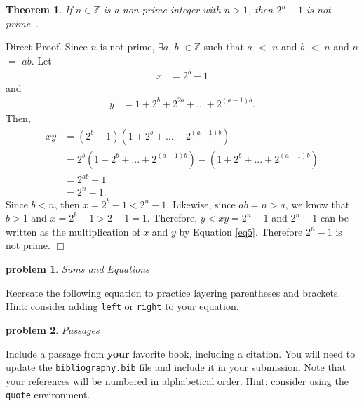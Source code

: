 \documentclass[10pt]{article}
\newenvironment{proof}{\par\noindent{\it Proof.}\hspace*{1em}}{$\Box$\bigskip}
\newtheorem{problem}{\sc\color{cit}problem}
\newtheorem{theorem}{Theorem}
\newcommand{\Z}{\mathbb{Z}} %
\begin{document}
\begin{theorem}
    If $n \in \Z$ is a non-prime integer with $n>1$, then $2^n - 1$ is not prime~\cite{velleman}.
\end{theorem}

\begin{proof}
    Direct Proof. Since $n$ is not prime, $\exists$$a$, $b$ $\in \Z$ such that $a$ $<$ $n$ and $b$ $<$ $n$ and $n$ $=$ $ab$. Let
    \begin{align*}
        x &= 2^b - 1
    \end{align*}
    and
    \begin{align*}
        y &= 1 + 2^b + 2^{2b} + ... + 2^{(a - 1)b}.
    \end{align*}
    Then, 
    \begin{align}
        xy &= (2^b - 1)(1 + 2^b + ... + 2^{(a - 1)b}) \\
           &= 2^b(1 + 2^b + ... + 2^{(a - 1)b}) - (1 + 2^b + ... + 2^{(a - 1)b}) \\
           &= 2^{ab} - 1 \\
           \label{eq5}
           &= 2^n - 1.
    \end{align}
    Since $b < n$, then $x = 2^b - 1 < 2^n - 1$. Likewise, since $ab = n > a$, we know that $b > 1$ and 
    $x = 2^b - 1 > 2 - 1 = 1$. Therefore, $y < xy = 2^n - 1$ and $2^n - 1$ can be written as the multiplication
    of $x$ and $y$ by Equation \ref{eq5}. Therefore $2^n - 1$ is not prime.
\end{proof}







\begin{problem} Sums and Equations \end{problem}

Recreate the following equation to practice layering parentheses and brackets.  Hint: consider adding \verb|left| or \verb|right| to your equation.






\begin{problem} Passages \end{problem}
    Include a passage from \textbf{your} favorite book, including a citation.  You will need to update the \verb|bibliography.bib| file and include it in your submission. Note that your references will be numbered in alphabetical order.  Hint: consider using the \verb|quote| environment.
\end{document}
